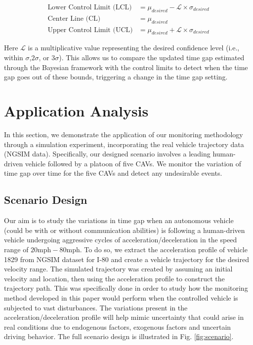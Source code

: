 \documentclass{article}
\begin{document}
\begin{align}
\label{eq:limits}
    \mbox{Lower Control Limit (LCL)} &= \mu_{desired} - \mathcal{L}\times\sigma_{desired}\\
    \mbox{Center Line (CL)} &= \mu_{desired}\\
    \mbox{Upper Control Limit (UCL)} &= \mu_{desired} + \mathcal{L}\times\sigma_{desired}
\end{align}

Here $\mathcal{L}$ is a multiplicative value representing the desired confidence level (i.e., within $\sigma$,$2\sigma$, or $3\sigma$). This allows us to compare the updated time gap estimated through the Bayesian framework with the control limits to detect when the time gap goes out of these bounds, triggering a change in the time gap setting. 


\section{Application Analysis}
In this section, we demonstrate the application of our monitoring methodology through a simulation experiment, incorporating the real vehicle trajectory data (NGSIM data). Specifically, our designed scenario involves a leading human-driven vehicle followed by a platoon of five CAVs. We monitor the variation of time gap over time for the five CAVs and detect any undesirable events.

\subsection{Scenario Design}
Our aim is to study the variations in time gap when an autonomous vehicle (could be with or without communication abilities) is following a human-driven vehicle undergoing aggressive cycles of acceleration/deceleration in the speed range of $20\mbox{mph} - 80\mbox{mph}$. To do so, we extract the acceleration profile of vehicle 1829 from NGSIM dataset for I-80 \cite{ngism} and create a vehicle trajectory for the desired velocity range. The simulated trajectory was created by assuming an initial velocity and location, then using the acceleration profile to construct the trajectory path. This was specifically done in order to study how the monitoring method developed in this paper would perform when the controlled vehicle is subjected to vast disturbances. The variations present in the acceleration/deceleration profile will help mimic uncertainty that could arise in real conditions due to endogenous factors, exogenous factors and uncertain driving behavior. The full scenario design is illustrated in Fig. \ref{fig:scenario}. 
\end{document}
